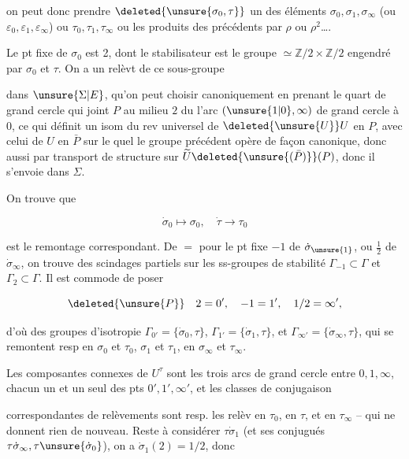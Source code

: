 on peut donc prendre $\deleted{\unsure{\sigma_0,\tau}}$ un des éléments $\sigma_0,\sigma_1,\sigma_\infty$ (ou $\varepsilon_0,\varepsilon_1,\varepsilon_\infty$) ou $\tau_0,\tau_1,\tau_\infty$ ou  les produits des précédents par  $\rho$ ou $\rho^2$\ldots.

 Le  pt fixe de $\sigma_0$ est 2, dont le stabilisateur est le groupe $\simeq\mathbb Z/2\times\mathbb Z/2$ engendré par $\sigma_0$ et $\tau$. On a un relèvt de ce sous-groupe

dans $\unsure{\Sigma|E}$, qu'on peut choisir canoniquement en prenant le quart de grand cercle qui joint $P$ au milieu $2$ du  l'arc $(\unsure{1|0},\infty)$ de grand cercle  à $0$, ce qui définit un isom du rev universel de $\deleted{\unsure{U}}U$ en $P$, avec celui de $U$ en $\bar P$ sur le quel le groupe précédent opère de façon canonique, donc aussi par transport de structure sur $\widetilde U\deleted{\unsure{(\bar P)}}(P)$, donc il s'envoie dans $\Sigma$.

On trouve que

\[
\dot\sigma_0\mapsto\sigma_0,\quad\dot\tau\longrightarrow\tau_0
\]

est le remontage correspondant. De $=$ pour le pt fixe $-1$ de $\dot\sigma_{\unsure{1}}$, ou $\frac12$ de $\dot\sigma_\infty$, on trouve des scindages partiels sur les ss-groupes de  stabilité $\Gamma_{-1}\subset\Gamma$ et $\Gamma_2\subset\Gamma$. Il est commode de poser

\[
\deleted{\unsure{P}}\quad 2=0',\quad-1=1',\quad1/2=\infty',
\]

d'où des groupes d'isotropie $\Gamma_{0'}=\{\dot\sigma_0,\tau\}$, $\Gamma_{1'}=\{\dot\sigma_1,\tau\}$, et $\Gamma_{\infty'}=\{\dot\sigma_\infty,\tau\}$, qui se remontent resp en $\sigma_0$ et $\tau_0$,  $\sigma_1$ et $\tau_1$, en $\sigma_\infty$ et $\tau_\infty$.

Les composantes connexes de $U^\tau$ sont les trois arcs de grand cercle entre $0,1,\infty$,   chacun un  et un seul des pts $0',1',\infty'$, et les classes de conjugaison

correspondantes de relèvements  sont resp. les relèv en $\tau_0$, en $\tau$, et en $\tau_\infty$ -- qui ne donnent rien de nouveau. Reste à considérer $\tau\dot\sigma_1$ (et ses conjugués  $\tau\dot\sigma_\infty,\tau\unsure{\dot\sigma_0}$), on a $\dot\sigma_1(2)=1/2$, donc

